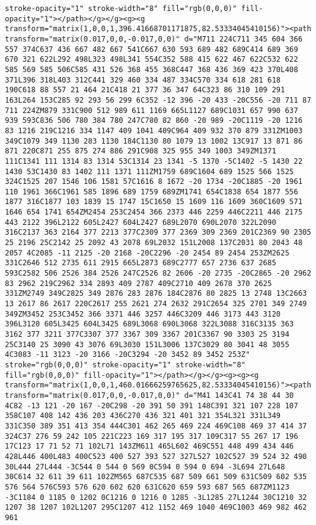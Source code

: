 \documentclass[
]{article}
\begin{document}
\begin{verbatim}
stroke-opacity="1" stroke-width="8" fill="rgb(0,0,0)" fill-opacity="1"></path></g></g><g><g transform="matrix(1,0,0,1,396.41668701171875,82.53334045410156)"><path transform="matrix(0.017,0,0,-0.017,0,0)" d="M711 224C711 345 604 366 557 374C637 436 667 482 667 541C667 630 593 689 482 689C414 689 369 670 321 622L292 498L323 498L341 554C352 588 415 622 467 622C532 622 585 569 585 506C585 431 526 368 455 368C447 368 436 369 423 370L408 371L396 318L403 312C441 329 460 334 487 334C570 334 618 281 618 190C618 88 557 21 464 21C418 21 377 36 347 64C323 86 310 109 291 163L264 153C285 92 293 56 299 6C352 -12 396 -20 433 -20C556 -20 711 87 711 224ZM879 331C900 512 989 611 1169 665L1127 689C1031 657 990 637 939 593C836 506 780 384 780 247C780 82 860 -20 989 -20C1119 -20 1216 83 1216 219C1216 334 1147 409 1041 409C964 409 932 370 879 331ZM1003 349C1079 349 1130 283 1130 184C1130 80 1079 13 1002 13C917 13 871 86 871 220C871 255 875 274 886 291C908 325 955 349 1003 349ZM1371 111C1341 111 1314 83 1314 53C1314 23 1341 -5 1370 -5C1402 -5 1430 22 1430 53C1430 83 1402 111 1371 111ZM1759 689C1604 689 1525 566 1525 324C1525 207 1546 106 1581 57C1616 8 1672 -20 1734 -20C1885 -20 1961 110 1961 366C1961 585 1896 689 1759 689ZM1741 654C1838 654 1877 556 1877 316C1877 103 1839 15 1747 15C1650 15 1609 116 1609 360C1609 571 1646 654 1741 654ZM2454 253C2454 366 2373 446 2259 446C2211 446 2175 443 2122 396L2122 605L2427 604L2427 689L2070 690L2070 322L2090 316C2137 363 2164 377 2213 377C2309 377 2369 309 2369 201C2369 90 2305 25 2196 25C2142 25 2092 43 2078 69L2032 151L2008 137C2031 80 2043 48 2057 4C2085 -11 2125 -20 2168 -20C2296 -20 2454 89 2454 253ZM2625 331C2646 512 2735 611 2915 665L2873 689C2777 657 2736 637 2685 593C2582 506 2526 384 2526 247C2526 82 2606 -20 2735 -20C2865 -20 2962 83 2962 219C2962 334 2893 409 2787 409C2710 409 2678 370 2625 331ZM2749 349C2825 349 2876 283 2876 184C2876 80 2825 13 2748 13C2663 13 2617 86 2617 220C2617 255 2621 274 2632 291C2654 325 2701 349 2749 349ZM3452 253C3452 366 3371 446 3257 446C3209 446 3173 443 3120 396L3120 605L3425 604L3425 689L3068 690L3068 322L3088 316C3135 363 3162 377 3211 377C3307 377 3367 309 3367 201C3367 90 3303 25 3194 25C3140 25 3090 43 3076 69L3030 151L3006 137C3029 80 3041 48 3055 4C3083 -11 3123 -20 3166 -20C3294 -20 3452 89 3452 253Z" stroke="rgb(0,0,0)" stroke-opacity="1" stroke-width="8" fill="rgb(0,0,0)" fill-opacity="1"></path></g></g><g><g><g transform="matrix(1,0,0,1,460.01666259765625,82.53334045410156)"><path transform="matrix(0.017,0,0,-0.017,0,0)" d="M41 143C41 74 38 44 30 4C82 -13 121 -20 167 -20C298 -20 391 50 391 148C391 321 107 228 107 358C107 408 142 436 203 436C270 436 321 401 321 354L321 331L349 331C350 389 351 413 354 444C301 462 265 469 224 469C108 469 37 414 37 324C37 276 59 242 105 221C223 169 317 195 317 109C317 55 267 17 196 17C123 17 71 52 71 102L71 143ZM611 465L602 469C551 448 499 434 446 428L446 400L483 400C523 400 527 393 527 327L527 102C527 39 524 32 490 30L444 27L444 -3C544 0 544 0 569 0C594 0 594 0 694 -3L694 27L648 30C614 32 611 39 611 102ZM565 687C535 687 509 661 509 631C509 602 535 576 564 576C593 576 620 602 620 631C620 659 593 687 565 687ZM1123 -3C1184 0 1185 0 1202 0C1216 0 1216 0 1285 -3L1285 27L1244 30C1210 32 1207 38 1207 102L1207 295C1207 412 1152 469 1040 469C1003 469 982 462 961 
\end{verbatim}
\end{document}
